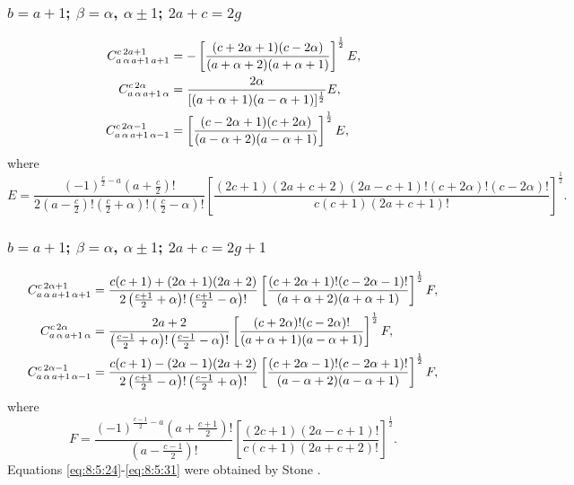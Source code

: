 \subsubsection{$b=a+1$; $\beta=\alpha$, $\alpha \pm 1$; $2 a+c=2 g$}
\begin{align}
C_{a\,\alpha\,a+1\,a+1}^{c\,2 a+1} & =-\left[\frac{(c+2 \alpha+1)(c-2 \alpha)}{(a+\alpha+2)(a+\alpha+1)}\right]^{\frac{1}{2}} E, \notag\\
C_{a\,\alpha\,a+1\,\alpha}^{c\,2 \alpha} & =\frac{2 \alpha}{[(a+\alpha+1)(a-\alpha+1)]^{\frac{1}{2}}} E, \label{eq:8:5:28}\\
C_{a\,\alpha\,a+1\,\alpha-1}^{c\,2 \alpha-1} & =\left[\frac{(c-2 \alpha+1)(c+2 \alpha)}{(a-\alpha+2)(a-\alpha+1)}\right]^{\frac{1}{2}} E, \notag
\end{align}
where
\begin{equation}
E=\frac{(-1)^{\frac{c}{2}-a}\left(a+\frac{c}{2}\right)!}{2\left(a-\frac{c}{2}\right)!\left(\frac{c}{2}+\alpha\right)!\left(\frac{c}{2}-\alpha\right)!}\left[\frac{(2 c+1)(2 a+c+2)(2 a-c+1)!(c+2 \alpha)!(c-2 \alpha)!}{c(c+1)(2 a+c+1)!}\right]^{\frac{1}{2}}. \label{eq:8:5:29}
\end{equation}
\subsubsection{$b=a+1$; $\beta=\alpha$, $\alpha \pm 1$; $2 a+c=2 g+1$}
\begin{align}
C_{a\,\alpha\,a+1\,\alpha+1}^{c\,2 \alpha+1} & =\frac{c(c+1)+(2 \alpha+1)(2 a+2)}{2\left(\frac{c+1}{2}+\alpha\right)!\left(\frac{c+1}{2}-\alpha\right)!}\left[\frac{(c+2 \alpha+1)!(c-2 \alpha-1)!}{(a+\alpha+2)(a+\alpha+1)}\right]^{\frac{1}{2}} F, \notag\\
C_{a\,\alpha\,a+1\,\alpha}^{c\,2 \alpha} & =\frac{2 a+2}{\left(\frac{c-1}{2}+\alpha\right)!\left(\frac{c-1}{2}-\alpha\right)!}\left[\frac{(c+2 \alpha)!(c-2 \alpha)!}{(a+\alpha+1)(a-\alpha+1)}\right]^{\frac{1}{2}} F, \label{eq:8:5:30}\\
C_{a\,\alpha\,a+1\,\alpha-1}^{c\,2 \alpha-1} & =\frac{c(c+1)-(2 \alpha-1)(2 a+2)}{2\left(\frac{c+1}{2}-\alpha\right)!\left(\frac{c-1}{2}+\alpha\right)!}\left[\frac{(c+2 \alpha-1)!(c-2 \alpha+1)!}{(a-\alpha+2)(a-\alpha+1)}\right]^{\frac{1}{2}} F, \notag
\end{align}
where
\begin{equation}
F=\frac{(-1)^{\frac{c-1}{2}-a}\left(a+\frac{c+1}{2}\right)!}{\left(a-\frac{c-1}{2}\right)!}\left[\frac{(2 c+1)(2 a-c+1)!}{c(c+1)(2 a+c+2)!}\right]^{\frac{1}{2}}. \label{eq:8:5:31}
\end{equation}
Equations \eqref{eq:8:5:24}-\eqref{eq:8:5:31} were obtained by Stone \cite{ref107}.

